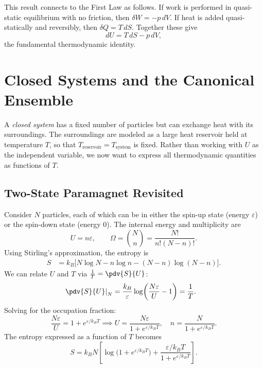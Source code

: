 This result connects to the First Law as follows. If work is performed in quasi-static equilibrium with no friction, then $\delta W = -p\,dV$. If heat is added quasi-statically and reversibly, then $\delta Q = T\,dS$. Together these give
\begin{equation}
    dU = T\,dS - p\,dV,
\end{equation}
the fundamental thermodynamic identity.

\section{Closed Systems and the Canonical Ensemble}

A \emph{closed system} has a fixed number of particles but can exchange heat with its surroundings. The surroundings are modeled as a large heat reservoir held at temperature $T$, so that $T_\text{reservoir} = T_\text{system}$ is fixed. Rather than working with $U$ as the independent variable, we now want to express all thermodynamic quantities as functions of $T$.

\subsection{Two-State Paramagnet Revisited}

Consider $N$ particles, each of which can be in either the spin-up state (energy $\varepsilon$) or the spin-down state (energy $0$). The internal energy and multiplicity are
\begin{equation}
    U = n\varepsilon, \qquad \Omega = \binom{N}{n} = \frac{N!}{n!(N-n)!}.
\end{equation}
Using Stirling's approximation, the entropy is
\begin{align}
    S &= k_B \bigl[N\log N - n\log n - (N-n)\log(N-n)\bigr].
\end{align}
We can relate $U$ and $T$ via $\frac{1}{T} = \pdv{S}{U}$:
\begin{align}
    \left.\pdv{S}{U}\right|_N
    &= \frac{k_B}{\varepsilon}\log\!\left(\frac{N\varepsilon}{U} - 1\right) = \frac{1}{T}.
\end{align}
Solving for the occupation fraction:
\begin{equation}
    \frac{N\varepsilon}{U} = 1 + e^{\varepsilon/k_B T}
    \implies U = \frac{N\varepsilon}{1 + e^{\varepsilon/k_B T}}, \quad n = \frac{N}{1+e^{\varepsilon/k_B T}}.
\end{equation}
The entropy expressed as a function of $T$ becomes
\begin{equation}
    S = k_B N\!\left[\log\!\bigl(1+e^{\varepsilon/k_B T}\bigr) + \frac{\varepsilon/k_B T}{1+e^{\varepsilon/k_B T}}\right].
\end{equation}

